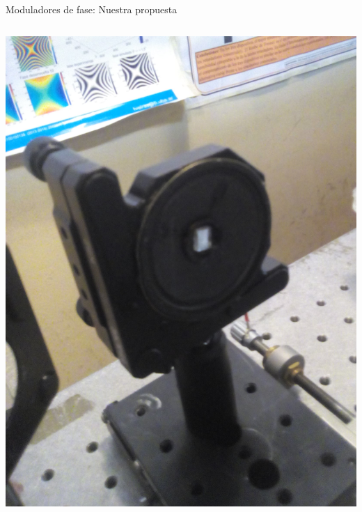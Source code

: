 \documentclass[mathserif]{beamer} %
\begin{document}
\begin{frame}
\begin{columns}[T]
\begin{column}{.475\linewidth}
\begin{block}{Moduladores de fase: Nuestra propuesta}
\begin{columns}
            \begin{column}{.33\linewidth}
            	\begin{center}
                \includegraphics[width=0.8\linewidth] {img/parlante_espejov2.png}
                 \end{center}
                 \end{column}

				\end{columns}
                \end{block}
                \vspace{1ex}
                
                \vspace{-2ex}


\end{column}
\end{columns}
\end{frame}
\end{document}
